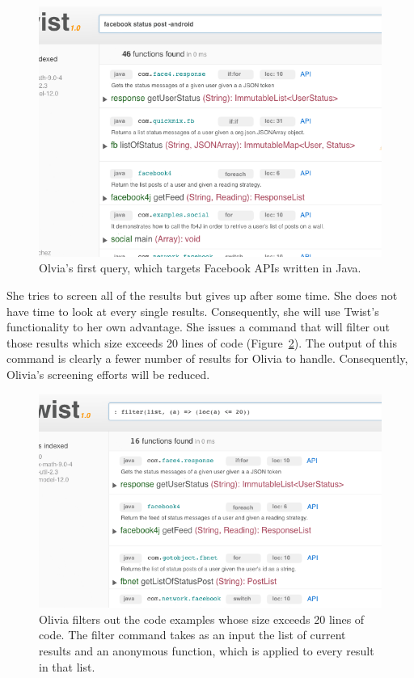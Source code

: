 \begin{figure}[!ht]
    \centering
    \includegraphics[width=\textwidth]{images/twistquery}
    \caption{Olvia's first query, which targets Facebook APIs written in Java.}
    \label{fig:twistquery}
\end{figure}

She tries to screen all of the results but gives up after some time. She does not have time to look at every single results. Consequently, she will use Twist's functionality to her own advantage. She issues a command that will filter out those results which size exceeds 20 lines of code (Figure~\ref{fig:twistslash}). The output of this command is clearly a fewer number of results for Olivia to handle. Consequently, Olivia's screening efforts will be reduced.

\begin{figure}[!ht]
    \centering
    \includegraphics[width=\textwidth]{images/twistslash}
    \caption{Olivia filters out the code examples whose size exceeds 20 lines of code. The 
	 filter command takes as an input the list of current results and an anonymous function, 
	 which is applied to every result in that list.}
    \label{fig:twistslash}
\end{figure}  

